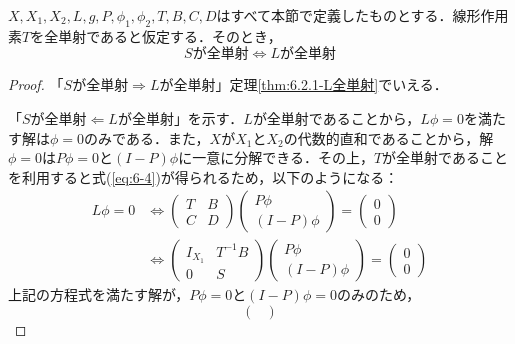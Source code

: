 \begin{thm}
  \label{thm:Sが全単射->Lが全単射}
  $X,X_1,X_2,L,g,P,\phi_1,\phi_2,T,B,C,D$はすべて本節で定義したものとする．線形作用素$T$を全単射であると仮定する．そのとき，
  \begin{equation*}
    Sが全単射 \Leftrightarrow Lが全単射
  \end{equation*}
\end{thm}

\begin{proof}
  「$Sが全単射 \Rightarrow Lが全単射$」定理\ref{thm:6.2.1-L全単射}でいえる．

  「$Sが全単射 \Leftarrow Lが全単射$」を示す．$L$が全単射であることから，$L\phi=0$を満たす解は$\phi = 0$のみである．また，$X$が$X_1$と$X_2$の代数的直和であることから，解$\phi=0$は$P\phi=0$と$(I-P)\phi$に一意に分解できる．その上，$T$が全単射であることを利用すると式(\ref{eq:6-4})が得られるため，以下のようになる：
  \begin{equation*}
    \begin{split}
      L\phi=0 &\Leftrightarrow
      \begin{pmatrix}
        T & B \\
        C & D
      \end{pmatrix}
      \begin{pmatrix}
        P \phi \\
        (I-P) \phi
      \end{pmatrix}
      =
      \begin{pmatrix}
        0 \\
        0
      \end{pmatrix}
      \\&\Leftrightarrow
      \begin{pmatrix}
        I_{X_1} & T^{-1}B \\
        0 & S
      \end{pmatrix}
      \begin{pmatrix}
        P \phi \\
        (I-P) \phi
      \end{pmatrix}
      =
      \begin{pmatrix}
        0 \\
        0
      \end{pmatrix}
    \end{split}
  \end{equation*}
  上記の方程式を満たす解が，$P\phi=0$と$(I-P)\phi=0$のみのため，
  \begin{equation*}
    \begin{pmatrix}

\end{pmatrix}
\end{equation*}
\end{proof}
